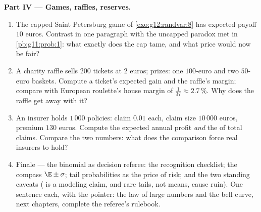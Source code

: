 \begin{problem}
\medskip
\noindent\textbf{Part IV --- Games, raffles, reserves.}
\begin{enumerate}[resume]
  \item The capped Saint Petersburg game of
        \cref{exo:g12:randvar:8} has expected payoff $10$
        euros. Contrast in one paragraph with the uncapped
        paradox met in \cref{pb:g11:prob:1}: what exactly does
        the cap tame, and what price would now be fair?
  \item A charity raffle sells $200$ tickets at $2$ euros;
        prizes: one $100$-euro and two $50$-euro baskets.
        Compute a ticket's expected gain and the raffle's
        margin; compare with European roulette's house margin
        of $\frac{1}{37} \approx 2.7\,\%$. Why does the raffle
        get away with it?
  \item An insurer holds $1\,000$  policies: claim
         $0.01$ each, claim size $10\,000$ euros,
        premium $130$ euros. Compute the expected annual
        profit \emph{and} the  of total
        claims. Compare the two numbers: what does the
        comparison force real insurers to hold?
  \item Finale --- the binomial as decision referee: the
        recognition checklist; the compass $\E \pm \sigma$;
        tail probabilities as the price of risk; and the two
        standing caveats ( is a modeling claim, and
        rare tails, not means, cause ruin). One sentence each,
        with the pointer: the law of large numbers and the bell
        curve, next chapters, complete the referee's rulebook.
\end{enumerate}
\end{problem}
